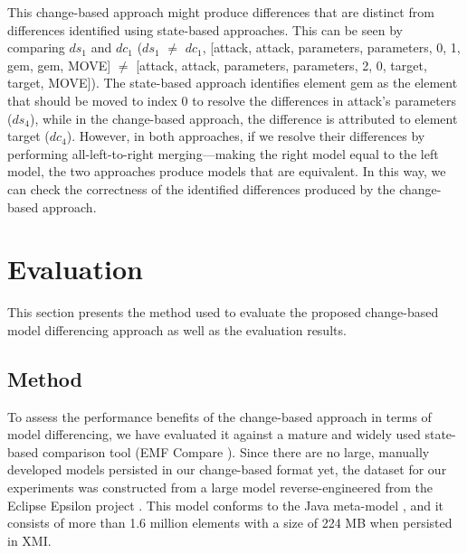 This change-based approach might produce differences that are distinct from differences identified using state-based approaches. This can be seen by comparing $ds_{1}$ and $dc_{1}$ ($ds_{1}$ $\neq$ $dc_{1}$, [\textsf{attack}, \textsf{attack}, \textsf{parameters}, \textsf{parameters}, 0, 1, \textsf{gem}, \textsf{gem}, \textsf{MOVE}] $\neq$ [\textsf{attack}, \textsf{attack}, \textsf{parameters}, \textsf{parameters}, 2, 0, \textsf{target}, \textsf{target}, \textsf{MOVE}]). The state-based approach identifies element \textsf{gem} as the element that should be moved to index 0 to resolve the differences in \textsf{attack}’s \textsf{parameters} ($ds_{4}$), while in the change-based approach, the difference is attributed to element \textsf{target} ($dc_{4}$). However, in both approaches, if we resolve their differences by performing all-left-to-right merging—making the right model equal to the left model, the two approaches produce models that are equivalent. In this way, we can check the correctness of the identified differences produced by the change-based approach.

\vspace{-10pt}
\section{Evaluation}
\label{sec:evaluation_6}
This section presents the method used to evaluate the proposed change-based model differencing approach as well as the evaluation results.

\subsection{Method}
\label{sec:method}
To assess the performance benefits of the change-based approach in terms of model differencing, we have evaluated it against a mature and widely used state-based comparison tool (EMF Compare \cite{emfcompare2018developer, eclipse2017compare}). Since there are no large, manually developed models persisted in our change-based format yet, the dataset for our experiments was constructed from a large model reverse-engineered from the Eclipse Epsilon project \cite{eclipse2018epsilongit, eclipse2017epsilon}. This model conforms to the Java meta-model \cite{eclipse2018modiscojava}, and it consists of more than 1.6 million elements with a size of 224 MB when persisted in XMI.

